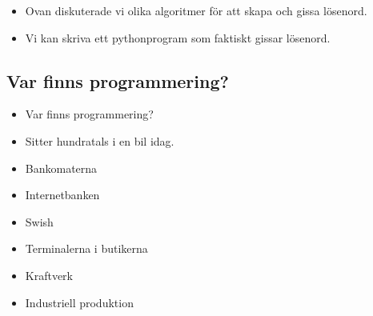 \begin{frame}
  \begin{example}[Lösenord]
    \begin{itemize}
      \item Ovan diskuterade vi olika algoritmer för att skapa och gissa 
        lösenord.
      \item Vi kan skriva ett pythonprogram som faktiskt gissar lösenord.
    \end{itemize}
  \end{example}
\end{frame}


\subsection{Var finns programmering?}

\begin{frame}
  \begin{exercise}
    \begin{itemize}
      \item Var finns programmering?
    \end{itemize}
  \end{exercise}
\end{frame}

\begin{frame}
  \begin{example}[Fordon]
    \begin{itemize}
      \item Sitter hundratals i en bil idag.
    \end{itemize}
  \end{example}

  \begin{example}
    \begin{itemize}
      \item Bankomaterna
      \item Internetbanken
      \item Swish
      \item Terminalerna i butikerna
    \end{itemize}
  \end{example}

  \begin{example}[Infrastruktur]
    \begin{itemize}
      \item Kraftverk
      \item Industriell produktion
    \end{itemize}
  \end{example}
\end{frame}

